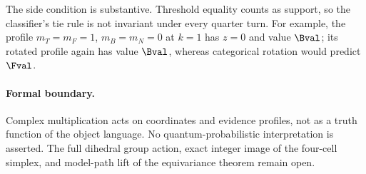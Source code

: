 The side condition is substantive. Threshold equality counts as support, so the
classifier's tie rule is not invariant under every quarter turn. For example,
the profile \(m_T=m_F=1\), \(m_B=m_N=0\) at \(k=1\) has \(z=0\) and value
\(\Bval\); its rotated profile again has value \(\Bval\), whereas categorical
rotation would predict \(\Fval\).

\paragraph{Formal boundary.}
Complex multiplication acts on coordinates and evidence profiles, not as a
truth function of the object language. No quantum-probabilistic interpretation
is asserted. The full dihedral group action, exact integer image of the
four-cell simplex, and model-path lift of the equivariance theorem remain open.
